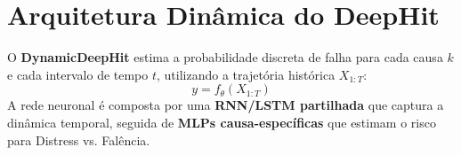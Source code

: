 \section{Arquitetura Dinâmica do DeepHit}

O \textbf{DynamicDeepHit} estima a probabilidade discreta de falha para cada causa $k$ e cada intervalo de tempo $t$, utilizando a trajetória histórica $X_{1:T}$:
\begin{equation}
    y = f_{\theta}(X_{1:T})
\end{equation}
A rede neuronal é composta por uma \textbf{RNN/LSTM partilhada} que captura a dinâmica temporal, seguida de \textbf{MLPs causa-específicas} que estimam o risco para Distress vs. Falência.
